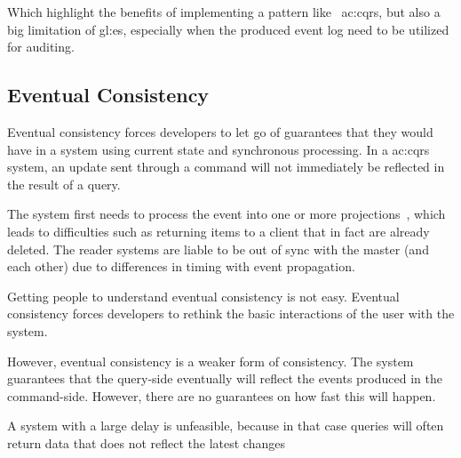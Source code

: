 Which highlight the benefits of implementing a pattern like ~\gls{ac:cqrs}, but also a big limitation of \gls{gl:es}, especially when the produced event log need to be utilized for auditing.

\subsection{Eventual Consistency}

Eventual consistency forces developers to let go of guarantees that they would have in a system using current state and synchronous processing. In a \gls{ac:cqrs} system, an update sent through a command will not immediately be reflected in the result of a query. 

The system first needs to process the event into one or more projections~\citep{OVEREEM2021110970}, which leads to difficulties such as returning items to a client that in fact are already deleted. The reader systems are liable to be out of sync with the master (and each other) due to differences in timing with event propagation.

Getting people to understand eventual consistency is not easy. Eventual consistency forces developers to rethink the basic interactions of the user with the system. 

However, eventual consistency is a weaker form of consistency. The system guarantees that the query-side eventually will reflect the events produced in the command-side. However, there are no guarantees on how fast this will happen. 

A system with a large delay is unfeasible, because in that case queries will often return data that does not reflect the latest changes

\pagebreak


